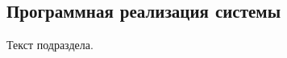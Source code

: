 \subsection{Программная реализация системы}
\label{sec:development:implementation}

Текст подраздела.
